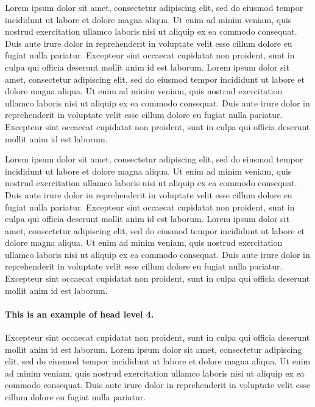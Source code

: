 \documentclass[english]{sbcreviews-2025}%
\begin{document}
Lorem ipsum dolor sit amet, consectetur adipiscing elit, sed do eiusmod tempor incididunt ut labore et dolore magna aliqua. Ut enim ad minim veniam, quis nostrud exercitation ullamco laboris nisi ut aliquip ex ea commodo consequat. Duis aute irure dolor in reprehenderit in voluptate velit esse cillum dolore eu fugiat nulla pariatur. Excepteur sint occaecat cupidatat non proident, sunt in culpa qui officia deserunt mollit anim id est laborum. Lorem ipsum dolor sit amet, consectetur adipiscing elit, sed do eiusmod tempor incididunt ut labore et dolore magna aliqua. Ut enim ad minim veniam, quis nostrud exercitation ullamco laboris nisi ut aliquip ex ea commodo consequat. Duis aute irure dolor in reprehenderit in voluptate velit esse cillum dolore eu fugiat nulla pariatur. Excepteur sint occaecat cupidatat non proident, sunt in culpa qui officia deserunt mollit anim id est laborum.

Lorem ipsum dolor sit amet, consectetur adipiscing elit, sed do eiusmod tempor incididunt ut labore et dolore magna aliqua. Ut enim ad minim veniam, quis nostrud exercitation ullamco laboris nisi ut aliquip ex ea commodo consequat. Duis aute irure dolor in reprehenderit in voluptate velit esse cillum dolore eu fugiat nulla pariatur. Excepteur sint occaecat cupidatat non proident, sunt in culpa qui officia deserunt mollit anim id est laborum. Lorem ipsum dolor sit amet, consectetur adipiscing elit, sed do eiusmod tempor incididunt ut labore et dolore magna aliqua. Ut enim ad minim veniam, quis nostrud exercitation ullamco laboris nisi ut aliquip ex ea commodo consequat. Duis aute irure dolor in reprehenderit in voluptate velit esse cillum dolore eu fugiat nulla pariatur. Excepteur sint occaecat cupidatat non proident, sunt in culpa qui officia deserunt mollit anim id est laborum.



\paragraph{This is an example of head level 4.}

Excepteur sint occaecat cupidatat non proident, sunt in culpa qui officia deserunt mollit anim id est laborum. Lorem ipsum dolor sit amet, consectetur adipiscing elit, sed do eiusmod tempor incididunt ut labore et dolore magna aliqua. Ut enim ad minim veniam, quis nostrud exercitation ullamco laboris nisi ut aliquip ex ea commodo consequat. Duis aute irure dolor in reprehenderit in voluptate velit esse cillum dolore eu fugiat nulla pariatur.
\end{document}
